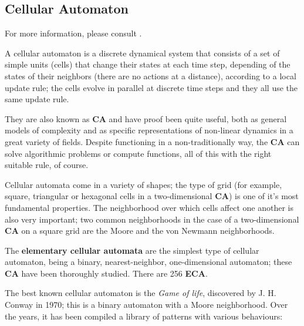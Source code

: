 
\subsection{Cellular Automaton}

For more information, please consult \cite{cellular-automata-sep,
cellular-automata-kari, cellular-automata-math, j1, j2, j3}.

A cellular automaton is a discrete dynamical system that consists of a set of
simple units (cells) that change their states at each time step, depending of
the states of their neighbors (there are no actions at a distance), according to
a local update rule; the cells evolve in parallel at discrete time steps and
they all use the same update rule.

They are also known as \textbf{CA} and have proof been quite useful, both as
general models of complexity and as specific representations of non-linear
dynamics in a great variety of fields. Despite functioning in a
non-traditionally way, the \textbf{CA} can solve algorithmic problems or
compute functions, all of this with the right suitable rule, of course.

Cellular automata come in a variety of shapes; the type of grid (for example,
square,  triangular or hexagonal cells in a two-dimensional \textbf{CA}) is one
of it's most fundamental properties. The neighborhood over which cells affect
one another is also very important; two common neighborhoods in the case of a
two-dimensional \textbf{CA} on a square grid are the Moore and the von Newmann
neighborhoods.

The \textbf{elementary cellular automata} are the simplest type of cellular
automaton, being a binary, nearest-neighbor, one-dimensional automaton; these
\textbf{CA} have been thoroughly studied. There are 256 \textbf{ECA}.

The best known cellular automaton is the \textit{Game of life}, discovered by
J. H. Conway in 1970; this is a binary automaton with a Moore neighborhood. Over
the years, it has been compiled a library of patterns with various behaviours:

